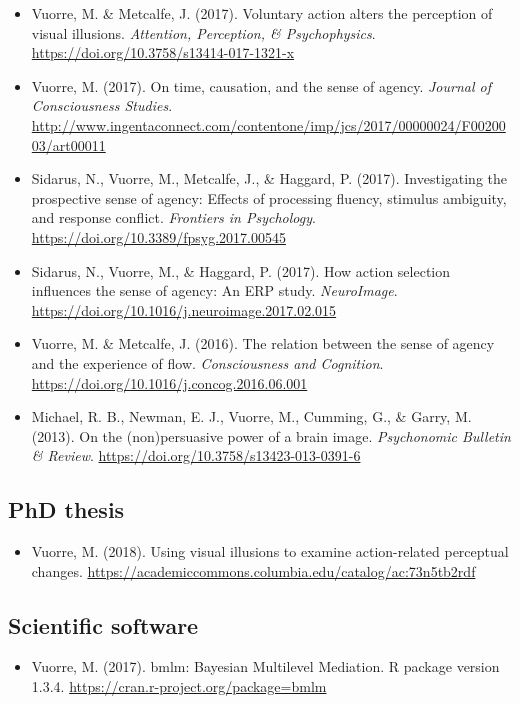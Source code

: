 \documentclass[12pt, a4paper]{article}
\newcommand{\years}[1]{\marginnote{\scriptsize #1}}
\begin{document}
\begin{itemize}
  \item Vuorre, M. \& Metcalfe, J. (2017). Voluntary action alters the perception of visual illusions. \emph{Attention, Perception, \& Psychophysics}. \url{https://doi.org/10.3758/s13414-017-1321-x}
  \item Vuorre, M. (2017). On time, causation, and the sense of agency. \emph{Journal of Consciousness Studies}. \url{http://www.ingentaconnect.com/contentone/imp/jcs/2017/00000024/F0020003/art00011}
  \item Sidarus, N., Vuorre, M., Metcalfe, J., \& Haggard, P. (2017). Investigating the prospective sense of agency: Effects of processing fluency, stimulus ambiguity, and response conflict. \emph{Frontiers in Psychology}. \url{https://doi.org/10.3389/fpsyg.2017.00545}
  \item Sidarus, N., Vuorre, M., \& Haggard, P. (2017). How action selection influences the sense of agency: An ERP study. \emph{NeuroImage}. \url{https://doi.org/10.1016/j.neuroimage.2017.02.015}
  \item \years{2016} Vuorre, M. \& Metcalfe, J. (2016). The relation between the sense of agency and the experience of flow. \emph{Consciousness and Cognition}. \url{https://doi.org/10.1016/j.concog.2016.06.001}
  \item \years{2013} Michael, R. B., Newman, E. J., Vuorre, M., Cumming, G., \& Garry, M. (2013). On the (non)persuasive power of a brain image. \emph{Psychonomic Bulletin \& Review}. \url{https://doi.org/10.3758/s13423-013-0391-6}
\end{itemize}

\subsection*{PhD thesis}
\begin{itemize}
  \item \years{2018} Vuorre, M. (2018). Using visual illusions to examine action-related perceptual changes. \url{https://academiccommons.columbia.edu/catalog/ac:73n5tb2rdf}
\end{itemize}

\subsection*{Scientific software}
\begin{itemize}
  \item \years{2017} Vuorre, M. (2017). bmlm: Bayesian Multilevel Mediation. R package version 1.3.4. \url{https://cran.r-project.org/package=bmlm}
\end{itemize}
\end{document}
